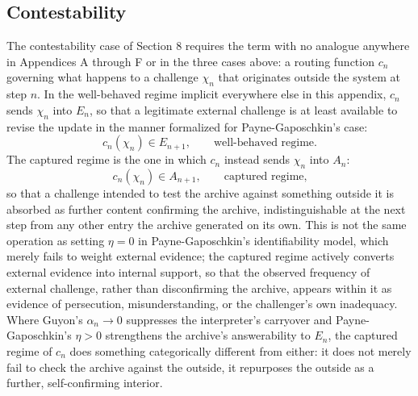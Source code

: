 \documentclass[11pt]{article}
\begin{document}
\subsection*{Contestability}

The contestability case of Section 8 requires the term with no analogue anywhere in Appendices A through F or in the three cases above: a routing function $c_n$ governing what happens to a challenge $\chi_n$ that originates outside the system at step $n$. In the well-behaved regime implicit everywhere else in this appendix, $c_n$ sends $\chi_n$ into $E_n$, so that a legitimate external challenge is at least available to revise the update in the manner formalized for Payne-Gaposchkin's case:
\[
c_n(\chi_n) \in E_{n+1}, \qquad \text{well-behaved regime.}
\]
The captured regime is the one in which $c_n$ instead sends $\chi_n$ into $A_n$:
\[
c_n(\chi_n) \in A_{n+1}, \qquad \text{captured regime,}
\]
so that a challenge intended to test the archive against something outside it is absorbed as further content confirming the archive, indistinguishable at the next step from any other entry the archive generated on its own. This is not the same operation as setting $\eta = 0$ in Payne-Gaposchkin's identifiability model, which merely fails to weight external evidence; the captured regime actively converts external evidence into internal support, so that the observed frequency of external challenge, rather than disconfirming the archive, appears within it as evidence of persecution, misunderstanding, or the challenger's own inadequacy. Where Guyon's $\alpha_n \to 0$ suppresses the interpreter's carryover and Payne-Gaposchkin's $\eta > 0$ strengthens the archive's answerability to $E_n$, the captured regime of $c_n$ does something categorically different from either: it does not merely fail to check the archive against the outside, it repurposes the outside as a further, self-confirming interior.
\end{document}
